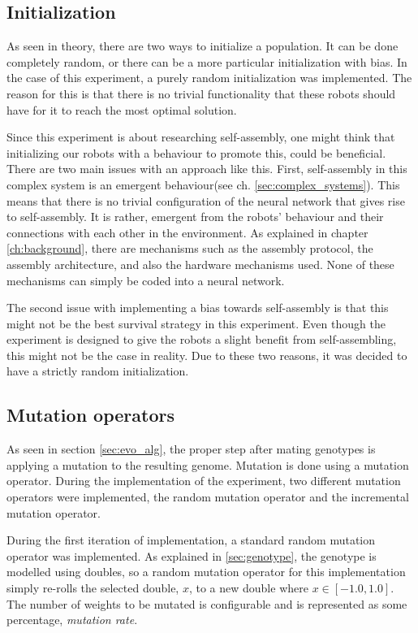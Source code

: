 \subsection{Initialization}
As seen in theory, there are two ways to initialize a population. 
It can be done completely random, or there can be a more particular initialization with bias. 
In the case of this experiment, a purely random initialization was implemented.
The reason for this is that there is no trivial functionality that these robots should have for it to reach the most optimal solution.

Since this experiment is about researching self-assembly, one might think that initializing our robots with a behaviour to promote this, could be beneficial.
There are two main issues with an approach like this.
First, self-assembly in this complex system is an emergent behaviour(see ch. \ref{sec:complex_systems}).
This means that there is no trivial configuration of the neural network that gives rise to self-assembly.
It is rather, emergent from the robots' behaviour and their connections with each other in the environment.
As explained in chapter \ref{ch:background}, there are mechanisms such as the assembly protocol, the assembly architecture, and also the hardware mechanisms used.
None of these mechanisms can simply be coded into a neural network.

The second issue with implementing a bias towards self-assembly is that this might not be the best survival strategy in this experiment.
Even though the experiment is designed to give the robots a slight benefit from self-assembling, this might not be the case in reality.
Due to these two reasons, it was decided to have a strictly random initialization.

\subsection{Mutation operators}
\label{mutation_operators}
As seen in section \ref{sec:evo_alg}, the proper step after mating genotypes is applying a mutation to the resulting genome.
Mutation is done using a mutation operator.
During the implementation of the experiment, two different mutation operators were implemented, the random mutation operator and the incremental mutation operator.

During the first iteration of implementation, a standard random mutation operator was implemented.
As explained in \ref{sec:genotype}, the genotype is modelled using doubles, so a random mutation operator for this implementation simply re-rolls the selected double, $x$, to a new double where $x \in [-1.0, 1.0]$. 
The number of weights to be mutated is configurable and is represented as some percentage, \emph{mutation rate}.

